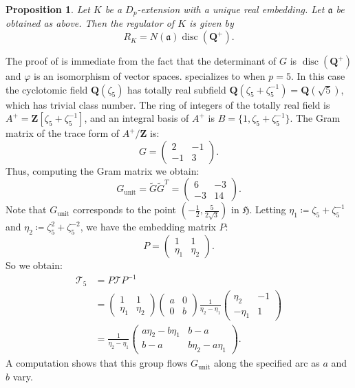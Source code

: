 \documentclass{amsart}
\newcommand{\QQ}{\mathbf{Q}}
\newcommand{\ZZ}{\mathbf{Z}}
\newcommand{\mf}[1]{\mathfrak{#1}}
\DeclareMathOperator{\disc}{disc}
\DeclareMathOperator{\unit}{unit}
\newtheorem{proposition}[theorem]{Proposition}
\numberwithin{equation}{section}
\begin{document}
\begin{proposition}\label{pregulator}
Let $K$ be a $D_p$-extension with a unique real embedding. Let $\mathfrak{a}$ be obtained as above. Then the regulator of $K$ is given by
		\[	R_K =  N(\mathfrak{a}) \disc(\QQ^+).	\]
\end{proposition}

The proof of  is immediate from the fact that the determinant of $G$ is $\disc(\QQ^+)$ and $\varphi$ is an isomorphism of vector spaces.  specializes to  when $p = 5$. In this case the cyclotomic field $\QQ(\zeta_5)$ has totally real subfield $\QQ(\zeta_5+\zeta_5^{-1}) = \QQ(\sqrt{5})$, which has trivial class number. The ring of integers of the totally real field is $A^+ = \ZZ[\zeta_5 + \zeta_5^{-1}]$, and an integral basis of $A^+$ is $B = \{1, \zeta_5+\zeta_5^{-1}\}$. The Gram matrix of the trace form of $A^+/\ZZ$ is:
\[
    G = \begin{pmatrix} 2 & -1 \\ -1 & 3\end{pmatrix}.
\]
Thus, computing the Gram matrix we obtain:
\[
    G_{\unit} = \widetilde{G}\widetilde{G}^T = \begin{pmatrix} 6 & -3 \\ -3 & 14\end{pmatrix}.
\]
Note that $G_{\unit}$ corresponds to the point $\left(-\frac{1}{2}, \frac{5}{2\sqrt{3}}\right)$ in $\mf{H}$. Letting $\eta_1 \coloneqq \zeta_5 + \zeta_5^{-1}$ and $\eta_2 \coloneqq \zeta_5^2 + \zeta_5^{-2}$, we have the embedding matrix $P$:
    \[  P = \begin{pmatrix} 1 & 1 \\ \eta_1 & \eta_2 \end{pmatrix}.\]
So we obtain:
    \begin{align*}
      \mathcal{T}_5     &   = P \mathcal{T} P^{-1}                                \\
                        &   = \begin{pmatrix} 1 & 1 \\ \eta_1 & \eta_2 \end{pmatrix}\begin{pmatrix} a & 0 \\ 0 & b \end{pmatrix} \frac{1}{\eta_2-\eta_1}\begin{pmatrix} \eta_2 & -1 \\ -\eta_1 & 1 \end{pmatrix} \\
                        &   =  \frac{1}{\eta_2 - \eta_1} \begin{pmatrix} a\eta_2 - b\eta_1 & b-a \\ b-a & b\eta_2 - a\eta_1 \end{pmatrix}.
\end{align*}   
A computation shows that this group flows $G_{\unit}$ along the specified arc as $a$ and $b$ vary.
\end{document}
